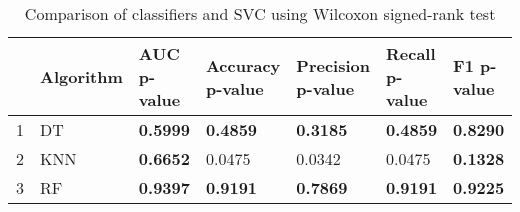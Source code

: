 \begin{table}
\footnotesize
\caption{Comparison of classifiers and SVC using Wilcoxon signed-rank test}
\label{tab:wilcoxon comparison}
\begin{tabular}{lllllll}
\hline
 & Algorithm & AUC p-value & Accuracy p-value & Precision p-value & Recall p-value & F1 p-value \\
\hline
1 & DT & \textbf{0.5999} & \textbf{0.4859} & \textbf{0.3185} & \textbf{0.4859} & \textbf{0.8290} \\
2 & KNN & \textbf{0.6652} & 0.0475 & 0.0342 & 0.0475 & \textbf{0.1328} \\
3 & RF & \textbf{0.9397} & \textbf{0.9191} & \textbf{0.7869} & \textbf{0.9191} & \textbf{0.9225} \\
\hline
\end{tabular}
\end{table}
